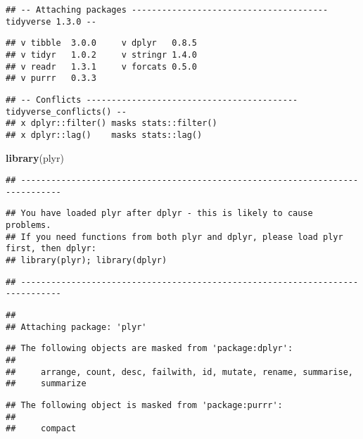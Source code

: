 \documentclass[]{article}
\newenvironment{Shaded}{\begin{snugshade}}{\end{snugshade}}
\newcommand{\KeywordTok}[1]{\textcolor[rgb]{0.13,0.29,0.53}{\textbf{{#1}}}}
\newcommand{\NormalTok}[1]{{#1}}
\begin{document}
\begin{verbatim}
## -- Attaching packages --------------------------------------- tidyverse 1.3.0 --
\end{verbatim}

\begin{verbatim}
## v tibble  3.0.0     v dplyr   0.8.5
## v tidyr   1.0.2     v stringr 1.4.0
## v readr   1.3.1     v forcats 0.5.0
## v purrr   0.3.3
\end{verbatim}

\begin{verbatim}
## -- Conflicts ------------------------------------------ tidyverse_conflicts() --
## x dplyr::filter() masks stats::filter()
## x dplyr::lag()    masks stats::lag()
\end{verbatim}

\begin{Shaded}
\begin{Highlighting}[]
\KeywordTok{library}\NormalTok{(plyr)}
\end{Highlighting}
\end{Shaded}

\begin{verbatim}
## ------------------------------------------------------------------------------
\end{verbatim}

\begin{verbatim}
## You have loaded plyr after dplyr - this is likely to cause problems.
## If you need functions from both plyr and dplyr, please load plyr first, then dplyr:
## library(plyr); library(dplyr)
\end{verbatim}

\begin{verbatim}
## ------------------------------------------------------------------------------
\end{verbatim}

\begin{verbatim}
## 
## Attaching package: 'plyr'
\end{verbatim}

\begin{verbatim}
## The following objects are masked from 'package:dplyr':
## 
##     arrange, count, desc, failwith, id, mutate, rename, summarise,
##     summarize
\end{verbatim}

\begin{verbatim}
## The following object is masked from 'package:purrr':
## 
##     compact
\end{verbatim}
\end{document}
